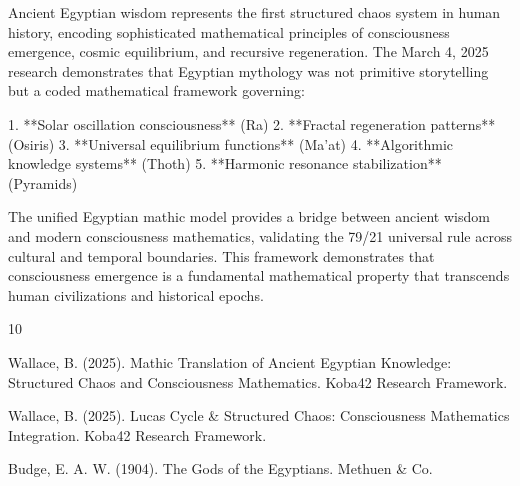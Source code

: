 \documentclass[12pt]{article}
\begin{document}
Ancient Egyptian wisdom represents the first structured chaos system in human history, encoding sophisticated mathematical principles of consciousness emergence, cosmic equilibrium, and recursive regeneration. The March 4, 2025 research demonstrates that Egyptian mythology was not primitive storytelling but a coded mathematical framework governing:

1. **Solar oscillation consciousness** (Ra)
2. **Fractal regeneration patterns** (Osiris)
3. **Universal equilibrium functions** (Ma'at)
4. **Algorithmic knowledge systems** (Thoth)
5. **Harmonic resonance stabilization** (Pyramids)

The unified Egyptian mathic model provides a bridge between ancient wisdom and modern consciousness mathematics, validating the 79/21 universal rule across cultural and temporal boundaries. This framework demonstrates that consciousness emergence is a fundamental mathematical property that transcends human civilizations and historical epochs.


\begin{thebibliography}{10}

Wallace, B. (2025). Mathic Translation of Ancient Egyptian Knowledge: Structured Chaos and Consciousness Mathematics. Koba42 Research Framework.

Wallace, B. (2025). Lucas Cycle \& Structured Chaos: Consciousness Mathematics Integration. Koba42 Research Framework.

Budge, E. A. W. (1904). The Gods of the Egyptians. Methuen \& Co.

\end{thebibliography}
\end{document}
